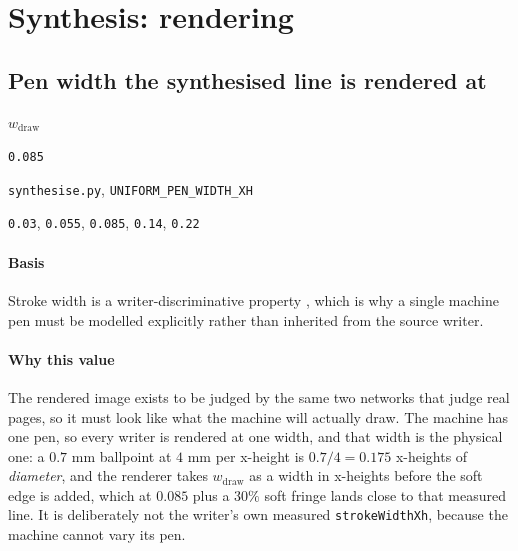 \section{Synthesis: rendering}

\subsection{Pen width the synthesised line is rendered at}

\label{coef:uniform-pen-width}

\begin{description}[leftmargin=5.2em,style=sameline]

\item[Symbol] $w_{\text{draw}}$

\item[Value] \texttt{0.085}

\item[Source] \texttt{synthesise.py}, \texttt{UNIFORM\_PEN\_WIDTH\_XH}

\item[Swept] \texttt{0.03}, \texttt{0.055}, \texttt{0.085}, \texttt{0.14}, \texttt{0.22}

\end{description}

\paragraph{Basis}

Stroke width is a writer-discriminative property \cite{brink2012, bulacu2007}, which is why a single machine pen must be modelled explicitly rather than inherited from the source writer.

\paragraph{Why this value}

The rendered image exists to be judged by the same two networks that judge real pages, so it must look like what the machine will actually draw. The machine has one pen, so every writer is rendered at one width, and that width is the physical one: a $0.7$ mm ballpoint at $4$ mm per x-height is $0.7/4 = 0.175$ x-heights of \emph{diameter}, and the renderer takes $w_{\text{draw}}$ as a width in x-heights before the soft edge is added, which at $0.085$ plus a $30\%$ soft fringe lands close to that measured line. It is deliberately not the writer's own measured \texttt{strokeWidthXh}, because the machine cannot vary its pen.

